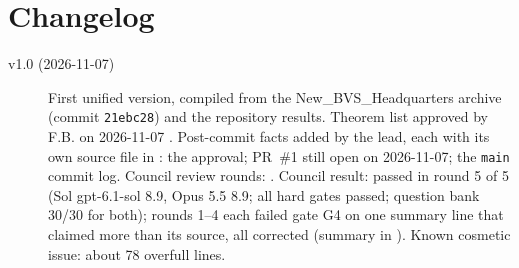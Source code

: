 \section{Changelog}\label{app:changelog}
\begin{description}
\item[v1.0 (2026-11-07)] First unified version, compiled from the New\_BVS\_Headquarters archive (commit \texttt{21ebc28}) and the repository results. Theorem list approved by F.B. on 2026-11-07 . Post-commit facts added by the lead, each with its own source file in : the approval; PR~\#1 still open on 2026-11-07; the \texttt{main} commit log. Council review rounds: . Council result: passed in round 5 of 5 (Sol gpt-6.1-sol 8.9, Opus 5.5 8.9; all hard gates passed; question bank 30/30 for both); rounds 1--4 each failed gate G4 on one summary line that claimed more than its source, all corrected (summary in ). Known cosmetic issue: about 78 overfull lines.

\end{description}

